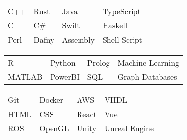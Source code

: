 \documentclass[paper=a4,fontsize=8.5pt]{resume}
\begin{document}
{	
		\begin{tabular}{llll}
			C++ & Rust & Java & TypeScript \\
			C & C\# & Swift & Haskell \\
			Perl & Dafny & Assembly & Shell Script
		\end{tabular}

		\medskip\normalsize

		\begin{tabular}{llll}
			R & Python & Prolog & Machine Learning \\
			MATLAB & PowerBI & SQL & Graph Databases
		\end{tabular}

		\medskip\normalsize

		\begin{tabular}{llll}
			Git & Docker & AWS & VHDL \\
			HTML & CSS & React & Vue \\
			ROS & OpenGL & Unity & Unreal Engine \\
		\end{tabular}

}
\end{document}
